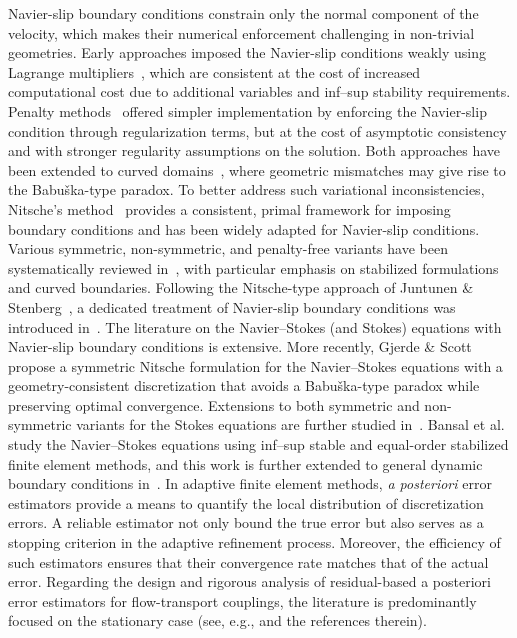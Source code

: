 \documentclass[10pt,a4paper]{article}
\begin{document}
Navier-slip boundary conditions constrain only the normal component of the velocity, which makes their numerical enforcement challenging in non-trivial geometries. Early approaches imposed the Navier-slip conditions weakly using Lagrange multipliers~\cite{MR1707832,verfurth1986finite,MR1124131}, which are consistent at the cost of 
increased computational cost due to additional variables and inf–sup stability requirements. Penalty methods~\cite{MR351118,MR853660,MR768643} offered simpler implementation by enforcing the Navier-slip condition through regularization terms, but at the cost of asymptotic consistency and with stronger regularity assumptions on the solution. Both approaches have been extended to curved domains~\cite{MR2571324,MR3171814,MR3311462,MR3117433}, where geometric mismatches may give rise to the Babu{\v{s}}ka-type paradox. To better address such variational inconsistencies, Nitsche’s method~\cite{MR341903} provides a consistent, primal framework for imposing boundary conditions and has been widely adapted for Navier-slip conditions. Various symmetric, non-symmetric, and penalty-free variants have been systematically reviewed in~\cite{chouly2024review}, with particular emphasis on stabilized formulations and curved boundaries. Following the Nitsche-type approach of Juntunen \& Stenberg~\cite{MR2501054}, a dedicated treatment of Navier-slip boundary conditions was introduced in~\cite{MR3759094}. The literature on the Navier–Stokes (and Stokes) equations with Navier-slip boundary conditions is extensive. More recently, Gjerde \& Scott~\cite{MR4379970} propose a symmetric Nitsche formulation for the Navier–Stokes equations with a geometry-consistent discretization that avoids a Babuška-type paradox while preserving optimal convergence. Extensions to both symmetric and non-symmetric variants for the Stokes equations are further studied in~\cite{MR4744101}. Bansal et al.~\cite{MR4812237, MR4994515} study the Navier–Stokes equations using inf–sup stable and equal-order stabilized finite element methods, and this work is further extended to general dynamic boundary conditions in~\cite{GazcaOrozco2025Nitsche}. In adaptive finite element methods, \emph{a posteriori} error estimators provide a means to quantify the local distribution of discretization errors. A reliable estimator not only bound the true error but also serves as a stopping criterion in the adaptive refinement process. Moreover, the efficiency of such estimators ensures that their convergence rate matches that of the actual error. Regarding the design and rigorous analysis of residual-based a posteriori error estimators for flow-transport 
 couplings, the literature is predominantly focused on the stationary case (see, e.g., \cite{allendes2020stabilized, wilfrid2019posteriori, dib2019posteriori, alvarez2018posteriori, agroum2018posteriori, alvarez2016posteriori, zhang2011posteriori,MR2111747, becker2002solution} and the references therein).
\end{document}
